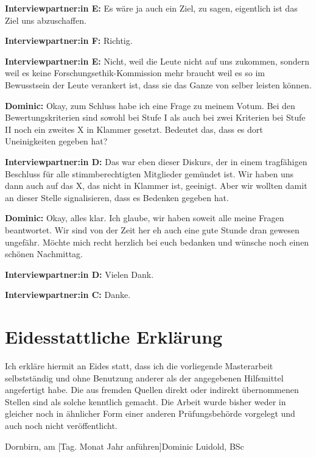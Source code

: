 \documentclass[a4paper,12pt,twoside]{scrreprt}
\begin{document}
\textbf{Interviewpartner:in E:} Es wäre ja auch ein Ziel, zu sagen, eigentlich ist das Ziel uns abzuschaffen.

\textbf{Interviewpartner:in F:} Richtig.

\textbf{Interviewpartner:in E:} Nicht, weil die Leute nicht auf uns zukommen, sondern weil es keine Forschungsethik-Kommission mehr braucht weil es so im Bewusstsein der Leute verankert ist, dass sie das Ganze von selber leisten können.

\textbf{Dominic:} Okay, zum Schluss habe ich eine Frage zu meinem Votum. Bei den Bewertungskriterien sind sowohl bei Stufe I als auch bei zwei Kriterien bei Stufe II noch ein zweites X in Klammer gesetzt. Bedeutet das, dass es dort Uneinigkeiten gegeben hat?

\textbf{Interviewpartner:in D:} Das war eben dieser Diskurs, der in einem tragfähigen Beschluss für alle stimmberechtigten Mitglieder gemündet ist. Wir haben uns dann auch auf das X, das nicht in Klammer ist, geeinigt. Aber wir wollten damit an dieser Stelle signalisieren, dass es Bedenken gegeben hat.

\textbf{Dominic:} Okay, alles klar. Ich glaube, wir haben soweit alle meine Fragen beantwortet. Wir sind von der Zeit her eh auch eine gute Stunde dran gewesen ungefähr. Möchte mich recht herzlich bei euch bedanken und wünsche noch einen schönen Nachmittag.

\textbf{Interviewpartner:in D:} Vielen Dank.

\textbf{Interviewpartner:in C:} Danke.

\clearpage
\chapter*{Eidesstattliche Erklärung}
Ich erkläre hiermit an Eides statt, dass ich die vorliegende Masterarbeit selbstständig und ohne Benutzung anderer als der angegebenen Hilfsmittel angefertigt habe. Die aus fremden Quellen direkt oder indirekt übernommenen Stellen sind als solche kenntlich gemacht. Die Arbeit wurde bisher weder in gleicher noch in ähnlicher Form einer anderen Prüfungsbehörde vorgelegt und auch noch nicht veröffentlicht.

\vspace{5cm}
\noindent
Dornbirn, am [Tag. Monat Jahr anführen]\hfill Dominic Luidold, BSc
\end{document}
